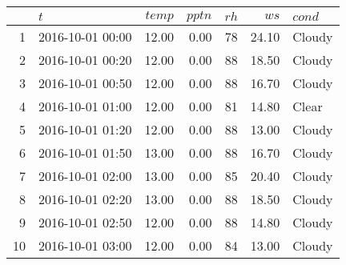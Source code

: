 \begin{tabular}{rlrrrrl}
  & $\mathit{t}$ & $\mathit{temp}$ & $\mathit{pptn}$ & $\mathit{rh}$ & $\mathit{ws}$ & $\mathit{cond}$ \\ 
  \hline
\hline
1 & 2016-10-01 00:00 & 12.00 & 0.00 &  78 & 24.10 & Cloudy \\ 
   \hline
2 & 2016-10-01 00:20 & 12.00 & 0.00 &  88 & 18.50 & Cloudy \\ 
   \hline
3 & 2016-10-01 00:50 & 12.00 & 0.00 &  88 & 16.70 & Cloudy \\ 
   \hline
4 & 2016-10-01 01:00 & 12.00 & 0.00 &  81 & 14.80 & Clear \\ 
   \hline
5 & 2016-10-01 01:20 & 12.00 & 0.00 &  88 & 13.00 & Cloudy \\ 
   \hline
6 & 2016-10-01 01:50 & 13.00 & 0.00 &  88 & 16.70 & Cloudy \\ 
   \hline
7 & 2016-10-01 02:00 & 13.00 & 0.00 &  85 & 20.40 & Cloudy \\ 
   \hline
8 & 2016-10-01 02:20 & 13.00 & 0.00 &  88 & 18.50 & Cloudy \\ 
   \hline
9 & 2016-10-01 02:50 & 12.00 & 0.00 &  88 & 14.80 & Cloudy \\ 
   \hline
10 & 2016-10-01 03:00 & 12.00 & 0.00 &  84 & 13.00 & Cloudy \\ 
  \end{tabular}
